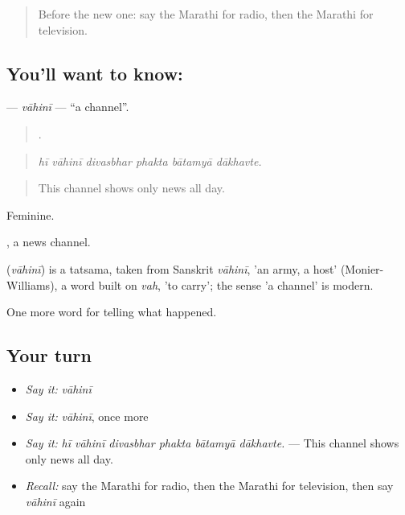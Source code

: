 \label{lesson:MR-C312-vahini}



\begin{quote}
Before the new one: say the Marathi for radio, then the Marathi for television.
\end{quote}

\subsection*{You'll want to know: }
\textbf{} — \emph{vāhinī} — \textquotedblleft{}a channel\textquotedblright{}.

\begin{quote}
     .
\end{quote}

\begin{quote}
\emph{hī vāhinī divasbhar phakta bātamyā dākhavte.}
\end{quote}

\begin{quote}
This channel shows only news all day.
\end{quote}

Feminine.

, a news channel.

\begin{cousinweb}
\textbf{} (\emph{vāhinī}) is a tatsama, taken from Sanskrit \emph{vāhinī}, 'an army, a host' (Monier-Williams), a word built on \emph{vah}, 'to carry'; the sense 'a channel' is modern.
\end{cousinweb}

\begin{grammarlens}[title={What you've built}]
One more word for telling what happened.
\end{grammarlens}

\subsection*{Your turn}
\begin{itemize}
\raggedright
  \item \emph{Say it:} \emph{vāhinī}
  \item \emph{Say it:} \emph{vāhinī}, once more
  \item \emph{Say it:} \emph{hī vāhinī divasbhar phakta bātamyā dākhavte.} — This channel shows only news all day.
  \item \emph{Recall:} say the Marathi for radio, then the Marathi for television, then say \emph{vāhinī} again
\end{itemize}

